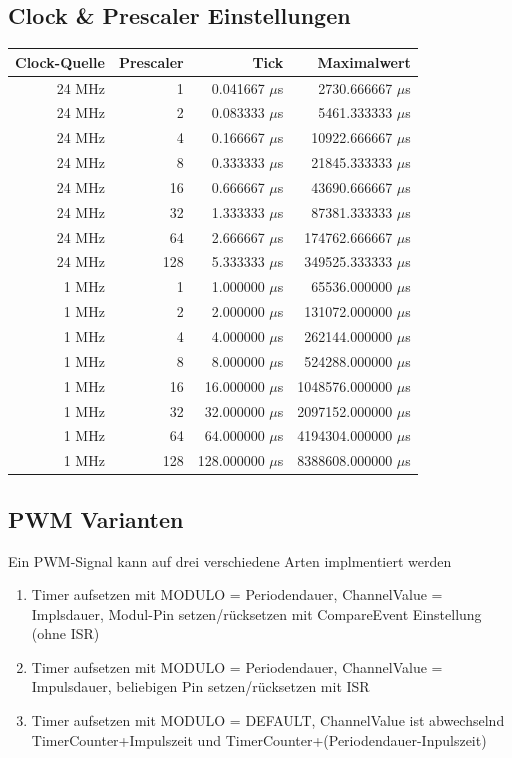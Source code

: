 \subsection{Clock \& Prescaler Einstellungen}
\begin{table}[h!]
	\centering
	\begin{tabular}{r r r r}
		Clock-Quelle & Prescaler & Tick & Maximalwert \\
		\hline
		24 MHz & 1 & 0.041667 $\mu$s & 2730.666667 $\mu$s \\ 
		24 MHz & 2 & 0.083333 $\mu$s & 5461.333333 $\mu$s \\ 
		24 MHz & 4 & 0.166667 $\mu$s & 10922.666667 $\mu$s \\ 
		24 MHz & 8 & 0.333333 $\mu$s & 21845.333333 $\mu$s \\ 
		24 MHz & 16 & 0.666667 $\mu$s & 43690.666667 $\mu$s \\ 
		24 MHz & 32 & 1.333333 $\mu$s & 87381.333333 $\mu$s \\ 
		24 MHz & 64 & 2.666667 $\mu$s & 174762.666667 $\mu$s \\ 
		24 MHz & 128 & 5.333333 $\mu$s & 349525.333333 $\mu$s \\ 
		1 MHz & 1 & 1.000000 $\mu$s & 65536.000000 $\mu$s \\ 
		1 MHz & 2 & 2.000000 $\mu$s & 131072.000000 $\mu$s \\ 
		1 MHz & 4 & 4.000000 $\mu$s & 262144.000000 $\mu$s \\ 
		1 MHz & 8 & 8.000000 $\mu$s & 524288.000000 $\mu$s \\ 
		1 MHz & 16 & 16.000000 $\mu$s & 1048576.000000 $\mu$s \\ 
		1 MHz & 32 & 32.000000 $\mu$s & 2097152.000000 $\mu$s \\ 
		1 MHz & 64 & 64.000000 $\mu$s & 4194304.000000 $\mu$s \\ 
		1 MHz & 128 & 128.000000 $\mu$s & 8388608.000000 $\mu$s \\ 
	\end{tabular}
\end{table}

\newpage
\subsection{PWM Varianten}
Ein PWM-Signal kann auf drei verschiedene Arten implmentiert werden
\begin{enumerate}
	\item Timer aufsetzen mit MODULO = Periodendauer, 
		ChannelValue = Implsdauer, Modul-Pin setzen/rücksetzen mit
		CompareEvent Einstellung (ohne ISR)
	\item Timer aufsetzen mit MODULO = Periodendauer,
		ChannelValue = Impulsdauer, beliebigen Pin setzen/rücksetzen
		mit ISR
	\item Timer aufsetzen mit MODULO = DEFAULT, ChannelValue ist
		abwechselnd TimerCounter+Impulszeit und
		TimerCounter+(Periodendauer-Inpulszeit)
\end{enumerate}

